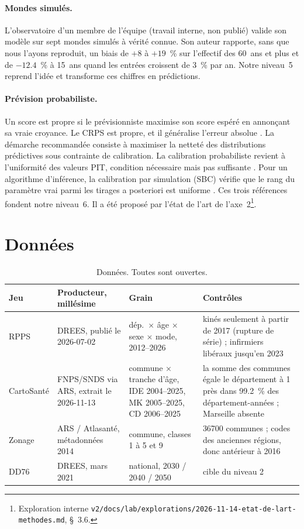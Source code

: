 \documentclass[11pt]{article}
\begin{document}
\paragraph{Mondes simulés.} L'observatoire d'un membre de l'équipe (travail interne, non publié)
valide son modèle sur sept mondes simulés à vérité connue. Son auteur rapporte, sans que nous
l'ayons reproduit,
un biais de $+8$ à $+19$~\% sur l'effectif des 60~ans et plus et de $-\num{12.4}$~\% à 15~ans quand
les entrées croissent de 3~\% par an. Notre niveau~5 reprend l'idée et transforme ces chiffres en
prédictions.

\paragraph{Prévision probabiliste.} Un score est propre si le prévisionniste maximise son score
espéré en annonçant sa vraie croyance. Le CRPS est propre, et il généralise l'erreur absolue
\citep{gneiting2007jasa}. La démarche recommandée consiste à maximiser la netteté des distributions
prédictives sous contrainte de calibration. La calibration probabiliste revient à l'uniformité des
valeurs PIT, condition nécessaire mais pas suffisante \citep{gneiting2007jrssb}. Pour un
algorithme d'inférence, la calibration par simulation (SBC) vérifie que le rang du paramètre vrai
parmi les tirages a posteriori est uniforme \citep{talts2018sbc}. Ces trois références fondent
notre niveau~6. Il a été proposé par l'état de l'art de l'axe~2\footnote{Exploration interne
\texttt{v2/docs/lab/explorations/2026-11-14-etat-de-lart-methodes.md}, \S~3.6.}.

\section{Données}
\begin{table}[h]
\centering\small
\begin{tabular}{@{}p{3.2cm}p{3.6cm}p{2.3cm}p{5.2cm}@{}}
\toprule
Jeu & Producteur, millésime & Grain & Contrôles \\
\midrule
RPPS \citep{drees2026demo} & DREES, publié le 2026-07-02 & dép.\ $\times$ âge $\times$ sexe $\times$ mode, 2012--2026 & kinés seulement à partir de 2017 (rupture de série) ; infirmiers libéraux jusqu'en 2023 \\
CartoSanté \citep{cartosante2026} & FNPS/SNDS via ARS, extrait le 2026-11-13 & commune $\times$ tranche d'âge, IDE 2004--2025, MK 2005--2025, CD 2006--2025 & la somme des communes égale le département à 1 près dans \num{99.2}\mesure{}~\% des département-années ; Marseille absente \\
Zonage \citep{atlasante2014zonage} & ARS / Atlasanté, métadonnées 2014 & commune, classes 1 à 5 et 9 & \num{36700}\mesure{} communes ; codes des anciennes régions, donc antérieur à 2016 \\
DD76 \citep{drees2021dd76} & DREES, mars 2021 & national, 2030 / 2040 / 2050 & cible du niveau 2 \\
\bottomrule
\end{tabular}
\caption{Données. Toutes sont ouvertes.}
\end{table}
\end{document}
